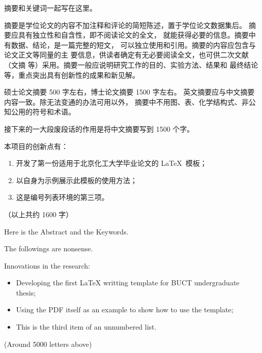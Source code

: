 \makedeclare%

\begin{cabstract}
	摘要和关键词一起写在这里。

	摘要是学位论文的内容不加注释和评论的简短陈述，置于学位论文数据集后。
	摘要应具有独立性和自含性，即不阅读论文的全文，
	就能获得必要的信息。摘要中有数据、结论，是一篇完整的短文，
	可以独立使用和引用。摘要的内容应包含与论文正文等同量的主
	要信息，供读者确定有无必要阅读全文，也可供二次文献（文摘
	等）采用。摘要一般应说明研究工作的目的、实验方法、结果和
	最终结论等，重点突出具有创新性的成果和新见解。
	
	硕士论文摘要 500 字左右，博士论文摘要 1500 字左右。
	英文摘要应与中文摘要内容一致。除无法变通的办法可用以外，
	摘要中不用图、表、化学结构式、非公知公用的符号和术语。
	
	接下来的一大段废段话的作用是将中文摘要写到 1500 个字。
	
	\zhlipsum[1-3]
	
	本项目的创新点有：
	\begin{enumerate}
		\item 开发了第一份适用于北京化工大学毕业论文的 \LaTeX\ 模板；
		\item 以自身为示例展示此模板的使用方法；
		\item 这是编号列表环境的第三项。
	\end{enumerate}

	（以上共约 1600 字）
\end{cabstract}

\begin{eabstract}
	Here is the Abstract and the Keywords.

	The followings are nonsense.

	\lipsum[1-7]

	Innovations in the research:
	\begin{itemize}
		\item Developing the first \LaTeX{} writting template for BUCT undergraduate thesis;
		\item Using the PDF itself as an example to show how to use the template;
		\item This is the third item of an unnumbered list.
	\end{itemize}

	(Around 5000 letters above)
\end{eabstract}